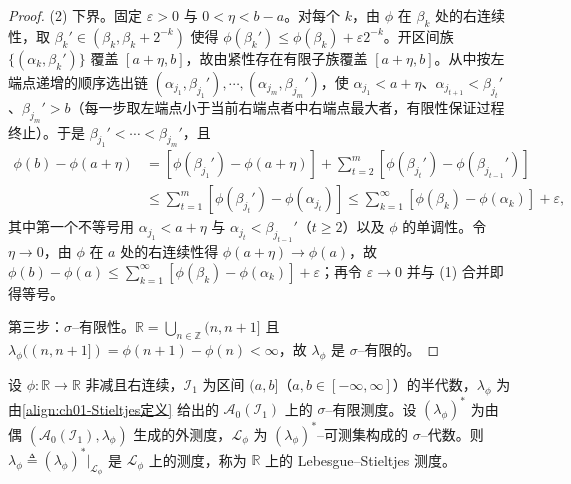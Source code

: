 \documentclass[../../main.tex]{subfiles}%
\begin{document}
\begin{proof}
(2) 下界。固定 $\varepsilon>0$ 与 $0<\eta<b-a$。对每个 $k$，由 $\phi$ 在 $\beta_k$ 处的右连续性，取 $\beta_k'\in(\beta_k,\beta_k+2^{-k})$ 使得 $\phi(\beta_k')\leqslant\phi(\beta_k)+\varepsilon2^{-k}$。开区间族 $\{(\alpha_k,\beta_k')\}$ 覆盖 $[a+\eta,b]$，故由紧性存在有限子族覆盖 $[a+\eta,b]$。从中按左端点递增的顺序选出链 $(\alpha_{j_1},\beta_{j_1}'),\cdots ,(\alpha_{j_m},\beta_{j_m}')$，使 $\alpha_{j_1}<a+\eta$、$\alpha_{j_{t+1}}<\beta_{j_t}'$、$\beta_{j_m}'>b$（每一步取左端点小于当前右端点者中右端点最大者，有限性保证过程终止）。于是 $\beta_{j_1}'<\cdots <\beta_{j_m}'$，且
\begin{align*}
\phi(b)-\phi(a+\eta)&=\left[\phi(\beta_{j_1}')-\phi(a+\eta)\right]+\sum_{t=2}^m\left[\phi(\beta_{j_t}')-\phi(\beta_{j_{t-1}}')\right]\\
&\leqslant\sum_{t=1}^m\left[\phi(\beta_{j_t}')-\phi(\alpha_{j_t})\right]
\leqslant\sum_{k=1}^\infty\left[\phi(\beta_k)-\phi(\alpha_k)\right]+\varepsilon,
\end{align*}
其中第一个不等号用 $\alpha_{j_1}<a+\eta$ 与 $\alpha_{j_t}<\beta_{j_{t-1}}'$（$t\geqslant2$）以及 $\phi$ 的单调性。令 $\eta\to0$，由 $\phi$ 在 $a$ 处的右连续性得 $\phi(a+\eta)\to\phi(a)$，故 $\phi(b)-\phi(a)\leqslant\sum_{k=1}^\infty[\phi(\beta_k)-\phi(\alpha_k)]+\varepsilon$；再令 $\varepsilon\to0$ 并与 (1) 合并即得等号。

第三步：$\sigma$--有限性。$\mathbb{R}=\bigcup_{n\in\mathbb{Z}}(n,n+1]$ 且 $\lambda_\phi((n,n+1])=\phi(n+1)-\phi(n)<\infty$，故 $\lambda_\phi$ 是 $\sigma$--有限的。
\end{proof}

\begin{definition}\label{definition:ch01-Stieltjes测度}
设 $\phi:\mathbb{R}\to\mathbb{R}$ 非减且右连续，$\mathcal{I}_1$ 为区间 $(a,b]$（$a,b\in[-\infty,\infty]$）的半代数，$\lambda_\phi$ 为由\eqref{align:ch01-Stieltjes定义} 给出的 $\mathcal{A}_0(\mathcal{I}_1)$ 上的 $\sigma$--有限测度。设 $(\lambda_\phi)^*$ 为由偶 $(\mathcal{A}_0(\mathcal{I}_1),\lambda_\phi)$ 生成的外测度，$\mathcal{L}_\phi$ 为 $(\lambda_\phi)^*$--可测集构成的 $\sigma$--代数。则 $\lambda_\phi\triangleq(\lambda_\phi)^*|_{\mathcal{L}_\phi}$ 是 $\mathcal{L}_\phi$ 上的测度，称为 $\mathbb{R}$ 上的 Lebesgue--Stieltjes 测度。
\end{definition}
\end{document}
